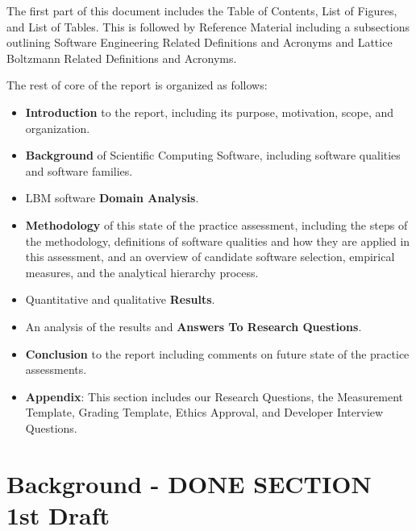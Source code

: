 \documentclass[12pt, notitlepage]{article}
\begin{document}
The first part of this document includes the Table of Contents, List of Figures, and List of Tables. This is followed by Reference Material including a subsections outlining Software Engineering Related Definitions and Acronyms and Lattice Boltzmann Related Definitions and Acronyms.

The rest of core of the report is organized as follows:

\begin{itemize}
	\item \textbf{Introduction} to the report, including its purpose, motivation, scope, and organization.
	\item \textbf{Background} of Scientific Computing Software, including software qualities and software families.
	\item LBM software \textbf{Domain Analysis}.
	\item \textbf{Methodology} of this state of the practice assessment, including the steps of the methodology, definitions of software qualities and how they are applied in this assessment, and an overview of candidate software selection, empirical measures, and the analytical hierarchy process. 
	\item Quantitative and qualitative \textbf{Results}. 
	\item An analysis of the results and \textbf{Answers To Research Questions}.
	\item \textbf{Conclusion} to the report including comments on future state of the practice assessments.
	\item \textbf{Appendix}: This section includes our Research Questions, the Measurement Template, Grading Template, Ethics Approval, and Developer Interview Questions.
\end{itemize}

\newpage
\section{Background - DONE SECTION 1st Draft}
\end{document}
